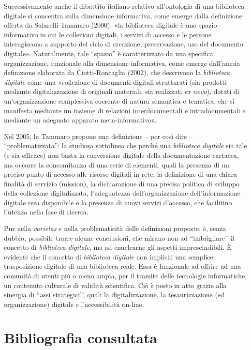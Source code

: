 \documentclass[
  b5paper,
  twoside,
  12pt,
  chapterprefix=false,
  bibliography=totocnumbered,
  parskip=false]{scrbook}
\begin{document}
Successivamente anche il dibattito italiano relativo all'ontologia di
una biblioteca digitale si concentra sulla dimensione informativa, come
emerge dalla definizione offerta da Salarelli-Tammaro (2000): «la
biblioteca digitale è uno spazio informativo in cui le collezioni
digitali, i servizi di accesso e le persone interagiscono a supporto del
ciclo di creazione, preservazione, uso del documento digitale».
Naturalmente, tale \enquote{spazio} è caratterizzato da una specifica
organizzazione, funzionale alla dimensione informativa, come emerge
dall'ampia definizione elaborata da Ciotti-Roncaglia (2002), che
descrivono la \emph{biblioteca digitale} come una «collezione di documenti
digitali strutturati (sia prodotti mediante digitalizzazione di
originali materiali, sia realizzati \emph{ex novo}), dotati di
un'organizzazione complessiva coerente di natura semantica e tematica,
che si manifesta mediante un insieme di relazioni interdocumentali e
intradocumentali e mediante un adeguato apparato meta-informativo».

Nel 2005, la Tammaro propone una definizione -- per così dire --
\enquote{problematizzata}: la studiosa sottolinea che perché una \emph{biblioteca
digitale} sia tale (e sia efficace) non basta la conversione digitale
della documentazione cartacea, ma occorre la concomitanza di una serie
di elementi, quali la presenza di un preciso punto di accesso alle
risorse digitali in rete, la definizione di una chiara finalità di
servizio (mission), la dichiarazione di una precisa politica di sviluppo
della collezione digitalizzata, l'adeguatezza dell'organizzazione
dell'informazione digitale resa disponibile e la presenza di nuovi
servizi d'accesso, che facilitino l'utenza nella fase di ricerca.

Pur nella \emph{varietas} e nella problematicità delle definizioni proposte,
è, senza dubbio, possibile trarre alcune conclusioni, che mirano non ad
\enquote{imbrigliare} il concetto di \emph{biblioteca digitale}, ma ad enuclearne gli
aspetti imprescindibili. È evidente che il concetto di \emph{biblioteca
digitale} non implichi una semplice trasposizione digitale di una
biblioteca reale. Essa è funzionale ad offrire ad una comunità di utenti
più o meno ampia, per il tramite delle tecnologie informatiche, un
contenuto culturale di validità scientifica. Ciò è posto in atto grazie
alla sinergia di \enquote{assi strategici}, quali la digitalizzazione, la
tesaurizzazione (ed organizzazione) digitale e l'accessibilità on-line.

\hypertarget{bibliografia-consultata-3}{%
\section*{Bibliografia consultata}\label{bibliografia-consultata-3}}
\end{document}
